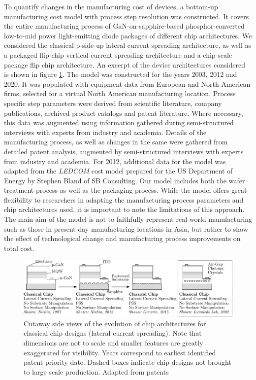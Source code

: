 \documentclass[a4paper,nocompress]{spie}  %
\begin{document}
        To quantify changes in the manufacturing cost of devices, a bottom-up manufacturing cost model with process step resolution was constructed. It covers the entire manufacturing process of GaN-on-sapphire-based phosphor-converted low-to-mid power light-emitting diode packages of different chip architectures. We considered the classical p-side-up lateral current spreading architecture, as well as a packaged flip-chip vertical current spreading architecture and a chip-scale package flip chip architecture. An excerpt of the device architectures considered is shown in figure \ref{fig:chip_arch}. The model was constructed for the years 2003, 2012 and 2020. It was populated with equipment data from European and North American firms, selected for a virtual North American manufacturing location. Process specific step parameters were derived from scientific literature, company publications, archived product catalogs and patent literature. Where necessary, this data was augmented using information gathered during semi-structured interviews with experts from industry and academia. Details of the manufacturing process, as well as changes in the same were gathered from detailed patent analysis, augmented by semi-structured interviews with experts from industry and academia. For 2012, additional data for the model was adapted from the \textit{LEDCOM} cost model prepared for the US Department of Energy by Stephen Bland of SB Consulting\cite{ledcomv2}. Our model includes both the wafer treatment process as well as the packaging process. While the model offers great flexibility to researchers in adapting the manufacturing process parameters and chip architectures used, it is important to note the limitations of this approach. The main aim of the model is not to faithfully represent real-world manufacturing such as those in present-day manufacturing locations in Asia, but rather to show the effect of technological change and manufacturing process improvements on total cost. 

        \begin{figure} [ht]
            \begin{center}
                \includegraphics[width=\textwidth]{SPIE/article/chip_architectures.pdf}
            \end{center}
            \caption{Cutaway side views of the evolution of chip architectures for classical chip designs (lateral current spreading). Note that dimensions are not to scale and smaller features are greatly exaggerated for visibility. Years correspond to earliest identified patent priority date. Dashed boxes indicate chip designs not brought to large scale production. Adapted from patents \cite{nagahama2013nitride,tanaka2010semiconductor,wierer2006photonic}}
            \label{fig:chip_arch}
        \end{figure}
\end{document}
